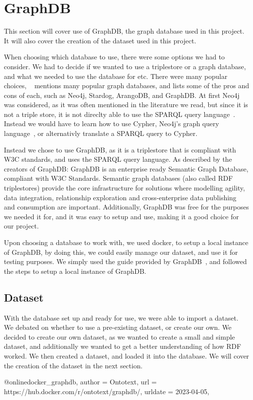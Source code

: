 \section{GraphDB}
This section will cover use of GraphDB, the graph database used in this project. It will also cover the creation of the dataset used in this project.

When choosing which database to use, there were some options we had to consider. We had to decide if we wanted to use a triplestore or a graph database, and what we needed to use the database for etc. There were many popular choices, ~\cite{best_graph_databases} mentions many popular graph databases, and lists some of the pros and cons of each, such as Neo4j, Stardog, ArangoDB, and GraphDB. At first Neo4j was considered, as it was often mentioned in the literature we read, but since it is not a triple store, it is not direclty able to use the SPARQL query language~\cite{neo4j:_a_reasonable_RDF_graph_database}. Instead we would have to learn how to use Cypher, Neo4j's graph query language~\cite{cypher_query_language}, or alternativly translate a SPARQL query to Cypher.

Instead we chose to use GraphDB, as it is a triplestore that is compliant with W3C standards, and uses the SPARQL query language. As described by the creators of GraphDB: \cite{graphDB}{GraphDB is an enterprise ready Semantic Graph Database, compliant with W3C Standards. Semantic graph databases (also called RDF triplestores) provide the core infrastructure for solutions where modelling agility, data integration, relationship exploration and cross-enterprise data publishing and consumption are important.}
Additionally, GraphDB was free for the purposes we needed it for, and it was easy to setup and use, making it a good choice for our project.

Upon choosing a database to work with, we used docker, to setup a local instance of GraphDB, by doing this, we could easily manage our dataset, and use it for testing purposes. We simply used the guide provided by GraphDB~\cite{docker_graphDB}, and followed the steps to setup a local instance of GraphDB.

\subsection{Dataset}
With the database set up and ready for use, we were able to import a dataset. We debated on whether to use a pre-existing dataset, or create our own.
We decided to create our own dataset, as we wanted to create a small and simple dataset, and additionally we wanted to get a better understanding of how \gls{RDF} worked.
We then created a dataset, and loaded it into the database. We will cover the creation of the dataset in the next section.



@online{docker_graphdb,
    author  = {Ontotext},
    url     = {https://hub.docker.com/r/ontotext/graphdb/},
    urldate = {2023-04-05},
}